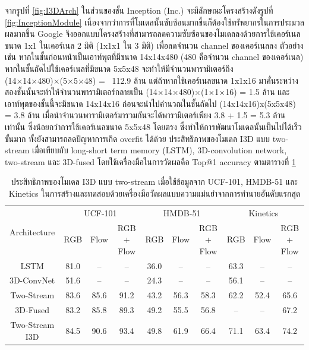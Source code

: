 \clearpage
จากรูปที่ \ref{fig:I3DArch} ในส่วนของชั้น Inception (Inc.) จะมีลักษณะโครงสร้างดังรูปที่ \ref{fig:InceptionModule} เนื่องจากว่าการที่โมเดลนั้นซับซ้อนมากขึ้นก็ต้องใช้ทรัพยากรในการประมวลผลมากขึ้น
Google จึงออกแบบโครงสร้างที่สามารถลดความซับซ้อนของโมเดลลงด้วยการใช้เคอร์เนลขนาด 1x1 ในเคอร์เนล 2 มิติ (1x1x1 ใน 3 มิติ) เพื่อลดจำนวน channel ของเคอร์เนลลง ตัวอย่างเช่น
หากในชั้นก่อนหน้าเป็นเอาท์พุตที่มีขนาด 14x14x480 (480 คือจำนวน channel ของเคอร์เนล) หากในชั้นถัดไปใช้เคอร์เนลที่มีขนาด 5x5x48 จะทำให้มีจำนวนพารามิเตอร์ถึง
(14×14×480)×(5×5×48) = ~112.9 ล้าน แต่ถ้าหากใช้เคอร์เนลขนาด 1x1x16 มาคั่นระหว่างสองชั้นนั้นจะทำให้จำนวนพารามิเตอร์กลายเป็น (14×14×480)×(1×1×16) = 1.5 ล้าน 
และเอาท์พุตของชั้นนี้จะมีขนาด 14x14x16 ก่อนจะนำไปคำนวณในชั้นถัดไป (14x14x16)x(5x5x48) = 3.8 ล้าน เมื่อนำจำนวนพารามิเตอร์มารวมกันจะได้พารามิเตอร์เพียง 3.8 + 1.5 = 5.3 ล้านเท่านั้น
ซึ่งน้อยกว่าการใช้เคอร์เนลขนาด 5x5x48 โดยตรง ซึ่งทำให้การพัฒนาโมเดลนั้นเป็นไปได้เร็วขั้นมาก ทั้งยังสามารถลดปัญหาการเกิด overfit ได้ด้วย
ประสิทธิภาพของโมเดล I3D แบบ two-stream เมื่อเทียบกับ long-short term memory (LSTM),
3D-convolution network, two-stream และ 3D-fused โดยใช้เครื่องมือในการวัดผลคือ Top@1 accuracy ตามตารางที่ \ref{tab:I3DPerformance}
\begin{table}[!ht]
    \begin{tabular}{|*{10}{c|}}
        \hline
        \multirow{2}{*}{Architecture} & \multicolumn{3}{c|}{UCF-101} & \multicolumn{3}{c|}{HMDB-51} & \multicolumn{3}{c|}{Kinetics}\\
        \cline{2-10}
            & RGB & Flow & RGB + Flow & RGB & Flow & RGB + Flow & RGB & Flow & RGB + Flow\\
        \hline\hline
        LSTM            & 81.0 & – & – & 36.0 & – & – & 63.3 & – & –\\
        3D-ConvNet      & 51.6 & – & – & 24.3 & – & – & 56.1 & – & –\\
        Two-Stream      & 83.6 & 85.6 & 91.2 & 43.2 & 56.3 & 58.3 & 62.2 & 52.4 & 65.6\\
        3D-Fused        & 83.2 & 85.8 & 89.3 & 49.2 & 55.5 & 56.8 & – & – & 67.2\\
        Two-Stream I3D  & 84.5 & 90.6 & 93.4 & 49.8 & 61.9 & 66.4 & 71.1 & 63.4 & 74.2\\
        \hline
    \end{tabular}
    \caption{ประสิทธิภาพของโมเดล I3D แบบ two-stream เมื่อใช้ข้อมูลจาก UCF-101, HMDB-51 และ Kinetics ในการสร้างและทดสอบด้วยเครื่องมือวัดผลแบบความแม่นยำจากการทำนายอันดับแรกสุด}
    \label{tab:I3DPerformance}
\end{table}